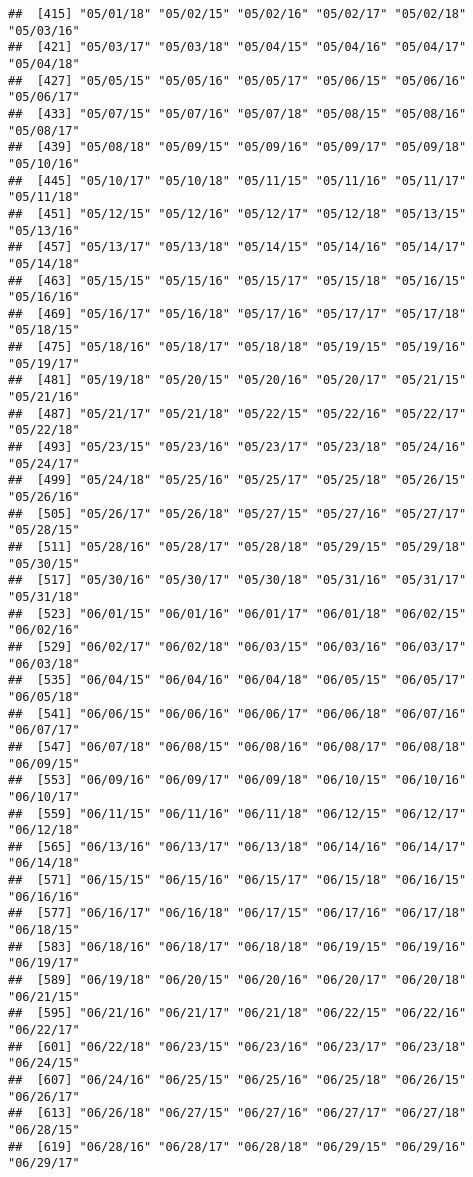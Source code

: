 \documentclass[]{article}
\begin{document}
\begin{verbatim}
##  [415] "05/01/18" "05/02/15" "05/02/16" "05/02/17" "05/02/18" "05/03/16"
##  [421] "05/03/17" "05/03/18" "05/04/15" "05/04/16" "05/04/17" "05/04/18"
##  [427] "05/05/15" "05/05/16" "05/05/17" "05/06/15" "05/06/16" "05/06/17"
##  [433] "05/07/15" "05/07/16" "05/07/18" "05/08/15" "05/08/16" "05/08/17"
##  [439] "05/08/18" "05/09/15" "05/09/16" "05/09/17" "05/09/18" "05/10/16"
##  [445] "05/10/17" "05/10/18" "05/11/15" "05/11/16" "05/11/17" "05/11/18"
##  [451] "05/12/15" "05/12/16" "05/12/17" "05/12/18" "05/13/15" "05/13/16"
##  [457] "05/13/17" "05/13/18" "05/14/15" "05/14/16" "05/14/17" "05/14/18"
##  [463] "05/15/15" "05/15/16" "05/15/17" "05/15/18" "05/16/15" "05/16/16"
##  [469] "05/16/17" "05/16/18" "05/17/16" "05/17/17" "05/17/18" "05/18/15"
##  [475] "05/18/16" "05/18/17" "05/18/18" "05/19/15" "05/19/16" "05/19/17"
##  [481] "05/19/18" "05/20/15" "05/20/16" "05/20/17" "05/21/15" "05/21/16"
##  [487] "05/21/17" "05/21/18" "05/22/15" "05/22/16" "05/22/17" "05/22/18"
##  [493] "05/23/15" "05/23/16" "05/23/17" "05/23/18" "05/24/16" "05/24/17"
##  [499] "05/24/18" "05/25/16" "05/25/17" "05/25/18" "05/26/15" "05/26/16"
##  [505] "05/26/17" "05/26/18" "05/27/15" "05/27/16" "05/27/17" "05/28/15"
##  [511] "05/28/16" "05/28/17" "05/28/18" "05/29/15" "05/29/18" "05/30/15"
##  [517] "05/30/16" "05/30/17" "05/30/18" "05/31/16" "05/31/17" "05/31/18"
##  [523] "06/01/15" "06/01/16" "06/01/17" "06/01/18" "06/02/15" "06/02/16"
##  [529] "06/02/17" "06/02/18" "06/03/15" "06/03/16" "06/03/17" "06/03/18"
##  [535] "06/04/15" "06/04/16" "06/04/18" "06/05/15" "06/05/17" "06/05/18"
##  [541] "06/06/15" "06/06/16" "06/06/17" "06/06/18" "06/07/16" "06/07/17"
##  [547] "06/07/18" "06/08/15" "06/08/16" "06/08/17" "06/08/18" "06/09/15"
##  [553] "06/09/16" "06/09/17" "06/09/18" "06/10/15" "06/10/16" "06/10/17"
##  [559] "06/11/15" "06/11/16" "06/11/18" "06/12/15" "06/12/17" "06/12/18"
##  [565] "06/13/16" "06/13/17" "06/13/18" "06/14/16" "06/14/17" "06/14/18"
##  [571] "06/15/15" "06/15/16" "06/15/17" "06/15/18" "06/16/15" "06/16/16"
##  [577] "06/16/17" "06/16/18" "06/17/15" "06/17/16" "06/17/18" "06/18/15"
##  [583] "06/18/16" "06/18/17" "06/18/18" "06/19/15" "06/19/16" "06/19/17"
##  [589] "06/19/18" "06/20/15" "06/20/16" "06/20/17" "06/20/18" "06/21/15"
##  [595] "06/21/16" "06/21/17" "06/21/18" "06/22/15" "06/22/16" "06/22/17"
##  [601] "06/22/18" "06/23/15" "06/23/16" "06/23/17" "06/23/18" "06/24/15"
##  [607] "06/24/16" "06/25/15" "06/25/16" "06/25/18" "06/26/15" "06/26/17"
##  [613] "06/26/18" "06/27/15" "06/27/16" "06/27/17" "06/27/18" "06/28/15"
##  [619] "06/28/16" "06/28/17" "06/28/18" "06/29/15" "06/29/16" "06/29/17"

\end{verbatim}
\end{document}
